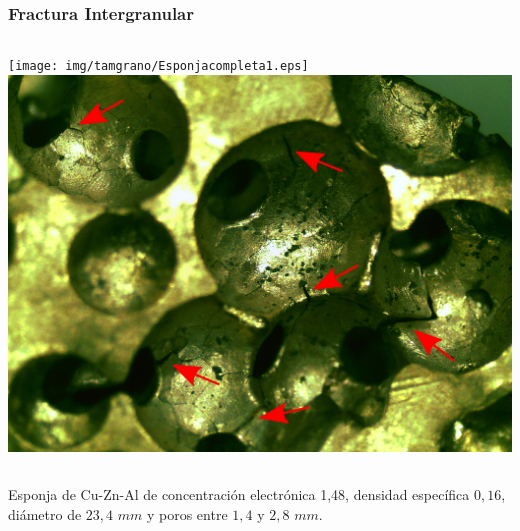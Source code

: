 \documentclass[usenames,dvipsnames]{beamer}
\begin{document}


\begin{frame}
\frametitle{Fractura Intergranular}


\begin{center}
\begin{columns}
\texttt{[image: img/tamgrano/Esponjacompleta1.eps]}
\includegraphics[width=\textwidth]{img/tamgrano/Fisuras.eps}
\end{columns}
\vspace{1cm}
 \begin{small}
Esponja de Cu-Zn-Al de concentración electrónica 1,48, densidad específica $0,16$, diámetro de $23,4$ $mm$ y poros entre $1,4$ y $2,8$ $mm$.
\end{small}
% 
\end{center}

%  
\end{frame}


\end{document}
